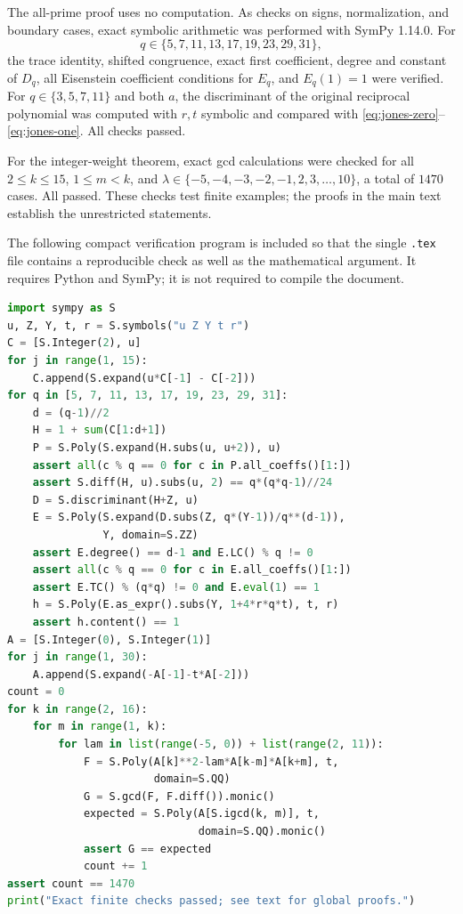 \documentclass[11pt,a4paper]{article}
\theoremstyle{definition}
\theoremstyle{remark}
\begin{document}
The all-prime proof uses no computation. As checks on signs,
normalization, and boundary cases, exact symbolic arithmetic was
performed with SymPy 1.14.0. For
\[
 q\in\{5,7,11,13,17,19,23,29,31\},
\]
the trace identity, shifted congruence, exact first coefficient,
degree and constant of $D_q$, all Eisenstein coefficient conditions
for $E_q$, and $E_q(1)=1$ were verified. For
$q\in\{3,5,7,11\}$ and both $a$, the discriminant of the original
reciprocal polynomial was computed with $r,t$ symbolic and
compared with \eqref{eq:jones-zero}--\eqref{eq:jones-one}.
All checks passed.

For the integer-weight theorem, exact gcd calculations were checked
for all $2\le k\le15$, $1\le m<k$, and
$\lambda\in\{-5,-4,-3,-2,-1,2,3,\ldots,10\}$, a total of
$1470$ cases. All passed. These checks test finite examples;
the proofs in the main text establish the unrestricted statements.

The following compact verification program is included so that the
single \texttt{.tex} file contains a reproducible check as well as
the mathematical argument. It requires Python and SymPy; it is not
required to compile the document.

\begin{lstlisting}[language=Python]
import sympy as S
u, Z, Y, t, r = S.symbols("u Z Y t r")
C = [S.Integer(2), u]
for j in range(1, 15):
    C.append(S.expand(u*C[-1] - C[-2]))
for q in [5, 7, 11, 13, 17, 19, 23, 29, 31]:
    d = (q-1)//2
    H = 1 + sum(C[1:d+1])
    P = S.Poly(S.expand(H.subs(u, u+2)), u)
    assert all(c % q == 0 for c in P.all_coeffs()[1:])
    assert S.diff(H, u).subs(u, 2) == q*(q*q-1)//24
    D = S.discriminant(H+Z, u)
    E = S.Poly(S.expand(D.subs(Z, q*(Y-1))/q**(d-1)),
               Y, domain=S.ZZ)
    assert E.degree() == d-1 and E.LC() % q != 0
    assert all(c % q == 0 for c in E.all_coeffs()[1:])
    assert E.TC() % (q*q) != 0 and E.eval(1) == 1
    h = S.Poly(E.as_expr().subs(Y, 1+4*r*q*t), t, r)
    assert h.content() == 1
A = [S.Integer(0), S.Integer(1)]
for j in range(1, 30):
    A.append(S.expand(-A[-1]-t*A[-2]))
count = 0
for k in range(2, 16):
    for m in range(1, k):
        for lam in list(range(-5, 0)) + list(range(2, 11)):
            F = S.Poly(A[k]**2-lam*A[k-m]*A[k+m], t,
                       domain=S.QQ)
            G = S.gcd(F, F.diff()).monic()
            expected = S.Poly(A[S.igcd(k, m)], t,
                              domain=S.QQ).monic()
            assert G == expected
            count += 1
assert count == 1470
print("Exact finite checks passed; see text for global proofs.")
\end{lstlisting}
\end{document}
